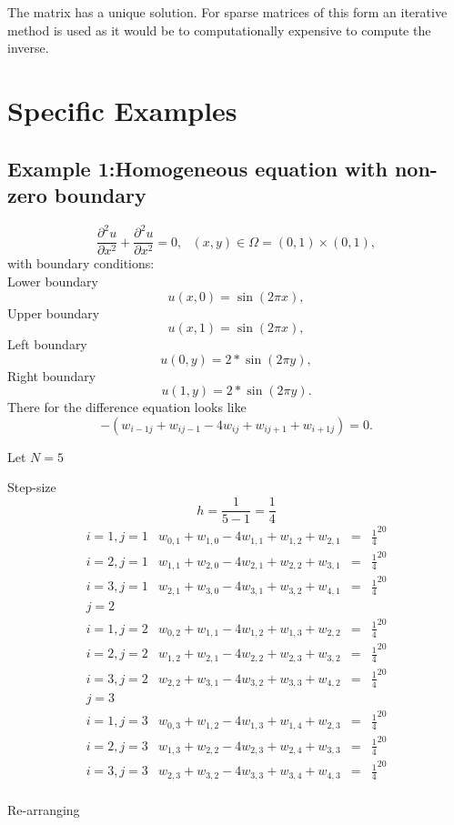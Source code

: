 The matrix has a unique solution. For sparse matrices of this form an iterative method is used as it would be to computationally expensive to compute the inverse.
\section{Specific Examples}
\subsection{Example 1:Homogeneous equation with non-zero boundary}
\[ \frac{\partial^2 u}{\partial x^2}+\frac{\partial^2 u}{\partial x^2}=0, \ \ \ (x,y) \in \Omega=(0,1)\times (0,1), \]
with boundary conditions:\\
Lower boundary
\[u(x,0) = \sin(2\pi x), \]
Upper boundary
\[u(x,1) = \sin(2\pi x),  \]
Left boundary
\[u(0,y) = 2*\sin(2\pi y), \]
Right boundary
\[u(1,y) =  2*\sin(2\pi y). \]
There for the difference equation looks like
\[-(w_{i-1j}+w_{ij-1}-4w_{ij}+w_{ij+1}+w_{i+1j})=0. \]

Let $N=5$

Step-size
\[h=\frac{1}{5-1}=\frac{1}{4}\]
\[\begin{array}{l|rcl}
i=1,j=1&w_{0,1}+w_{1,0}-4w_{1,1}+w_{1,2}+w_{2,1}&=&\frac{1}{4}^20\\
i=2,j=1&w_{1,1}+w_{2,0}-4w_{2,1}+w_{2,2}+w_{3,1}&=&\frac{1}{4}^20\\
i=3,j=1&w_{2,1}+w_{3,0}-4w_{3,1}+w_{3,2}+w_{4,1}&=&\frac{1}{4}^20\\
j=2\\
i=1,j=2&w_{0,2}+w_{1,1}-4w_{1,2}+w_{1,3}+w_{2,2}&=&\frac{1}{4}^20\\
i=2,j=2&w_{1,2}+w_{2,1}-4w_{2,2}+w_{2,3}+w_{3,2}&=&\frac{1}{4}^20\\
i=3,j=2&w_{2,2}+w_{3,1}-4w_{3,2}+w_{3,3}+w_{4,2}&=&\frac{1}{4}^20\\
j=3\\
i=1,j=3&w_{0,3}+w_{1,2}-4w_{1,3}+w_{1,4}+w_{2,3}&=&\frac{1}{4}^20\\
i=2,j=3&w_{1,3}+w_{2,2}-4w_{2,3}+w_{2,4}+w_{3,3}&=&\frac{1}{4}^20\\
i=3,j=3&w_{2,3}+w_{3,2}-4w_{3,3}+w_{3,4}+w_{4,3}&=&\frac{1}{4}^20\\
\end{array}
\]	

Re-arranging

